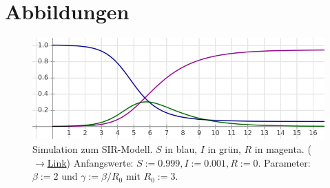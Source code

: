 \documentclass[a4paper,11pt,fleqn,twocolumn,twoside,dvipdfmx]{scrartcl}
\numberwithin{equation}{section}
\begin{document}
\clearpage
\onecolumn
\section{Abbildungen}

\begin{figure}[h]
\includegraphics[width=14cm]{img/SIR-Simulation-R0-drei.png}
\caption{Simulation zum SIR-Modell.
$S$ in blau, $I$ in grün, $R$ in magenta.\;\;%
(\href{https://cas-de.github.io/plot.htm?S(t),I(t),R(t);%
\%20\%5bS,I,R\%5d\%27=\%5b-beta*I*S,beta*I*S-gamma*I,gamma*I\%5d;%
\%20p:=\%5b0,0.999,0.001,0\%5d;\%20gamma:=beta/3;\%20beta:=2;%
\%20tw(0,40);;scale(1,0.2),P(10.2,0.5)}{$\rightarrow$Link})%
\newline
Anfangswerte: $S:=0.999,I:=0.001,R:=0$.\newline
Parameter: $\beta:=2$ und $\gamma:=\beta/R_0$ mit $R_0:=3$.}
\label{fig:R0-drei}
\end{figure}
\end{document}
